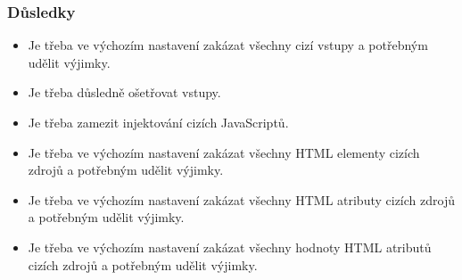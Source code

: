 \subsubsection{Důsledky}
\begin{itemize}
 \item Je třeba ve výchozím nastavení zakázat všechny cizí vstupy a potřebným udělit výjimky.
 \item Je třeba důsledně ošetřovat vstupy.
 \item Je třeba zamezit injektování cizích JavaScriptů.
 \item Je třeba ve výchozím nastavení zakázat všechny HTML elementy cizích zdrojů a potřebným udělit výjimky.
 \item Je třeba ve výchozím nastavení zakázat všechny HTML atributy cizích zdrojů a potřebným udělit výjimky.
 \item Je třeba ve výchozím nastavení zakázat všechny hodnoty HTML atributů cizích zdrojů a potřebným udělit výjimky.
\end{itemize}


